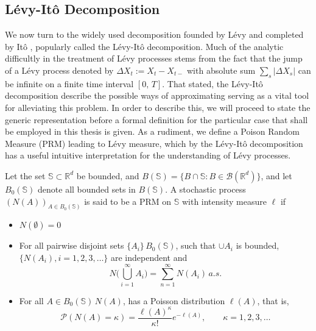 \subsection{L\'evy-It\^o Decomposition}
We now turn to the widely used decomposition founded by L\'evy  and completed by It\^o , popularly called the L\'evy-It\^o decomposition. Much of the analytic difficultly in the treatment of   L\'evy processes stems from the fact that the jump of a  L\'evy process denoted by $\Delta X_t := X_t - X_{t-}$ with absolute sum $\sum_s |\Delta X_s| $ can be infinite on a finite time interval $[0,\,T]$. That stated, the L\'evy-It\^o decomposition describe the possible ways of approximating serving as a vital tool for alleviating this problem. In order to describe this, we will proceed to state the generic representation before a formal definition for the particular case that shall be employed in this thesis is given. As a rudiment,  we define a Poison Random Measure (PRM) leading to L\'evy measure, which by the  L\'evy-It\^o decomposition has a useful intuitive interpretation for the understanding of L\'evy processes.
\begin{definition}
Let the set $\mathbb{S} \subset \mathbb{R}^d$ be bounded, and $B(\mathbb{S}) = \{ B \cap \mathbb{S} : B \in \mathcal{B}(\mathbb{R}^d) \}$, and let $B_0(\mathbb{S})$ denote all bounded sets in $B(\mathbb{S})$. A stochastic process $(N(A))_{A \in B_0(\mathbb{S})}$ is said to be a PRM on $\mathbb{S}$ with intensity measure $\ell$ if 
\begin{itemize}
    \item $N(\emptyset) = 0$
    \item For all pairwise disjoint sets $\{ A_i\} \, B_0(\mathbb{S})$, such that $\cup A_i$ is bounded,
    $\{ N(A_i), i = 1, 2, 3, \ldots \}$ are independent and 
    \begin{equation}
        N\Bigg( \bigcup_{i=1}^{\infty} A_{i} \Bigg) = \sum_{n=1}^{\infty} N(A_i) \, a.s.
    \end{equation}
    \item For all $A \in B_0(\mathbb{S}) \, N(A)$, has a Poisson distribution $\ell(A)$, that is,
    \begin{equation}
        \mathcal{P}(N(A) = \kappa) = \dfrac{\ell(A)^\kappa}{\kappa !}e^{-\ell(A)}, \qquad \kappa = 1, 2, 3, \ldots 
    \end{equation}
    \end{itemize}
\end{definition}
